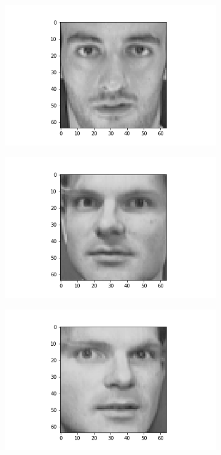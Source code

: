 \documentclass[12pt, a4paper]{article}
\begin{document}
\begin{figure}[h]
\begin{subfigure}{0.3\linewidth}
    \end{subfigure}
    \hfill
    \begin{subfigure}{0.3\linewidth}
        \centering
        \includegraphics[width=\linewidth]{images/q3/c/8/5.png}
    \end{subfigure}
    \newline
    \begin{subfigure}{0.3\linewidth}
        \centering
        \includegraphics[width=\linewidth]{images/q3/c/8/6.png}
    \end{subfigure}
    \hfill
    \begin{subfigure}{0.3\linewidth}
        \centering
        \includegraphics[width=\linewidth]{images/q3/c/8/7.png}

\end{subfigure}
\end{figure}
\end{document}
